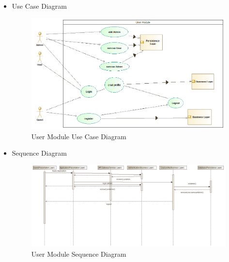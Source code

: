 \documentclass{article}
\begin{document}
\begin{itemize}
	 			\item Use Case Diagram
	 			\begin{center}
	 				\begin{figure}[!h]
	 					\includegraphics[scale=0.5]{uuc.png}
	 					\caption{User Module Use Case Diagram}
	 				\end{figure}
	 			\end{center}
	 			\pagebreak
	 			
				\item Sequence Diagram				
 				\begin{center}
 					\begin{figure}[!h]
 						\includegraphics[scale=0.4]{isdu.png}
 						\caption{User Module Sequence Diagram}
 					\end{figure}
 				\end{center}
 				

\end{itemize}
\end{document}
